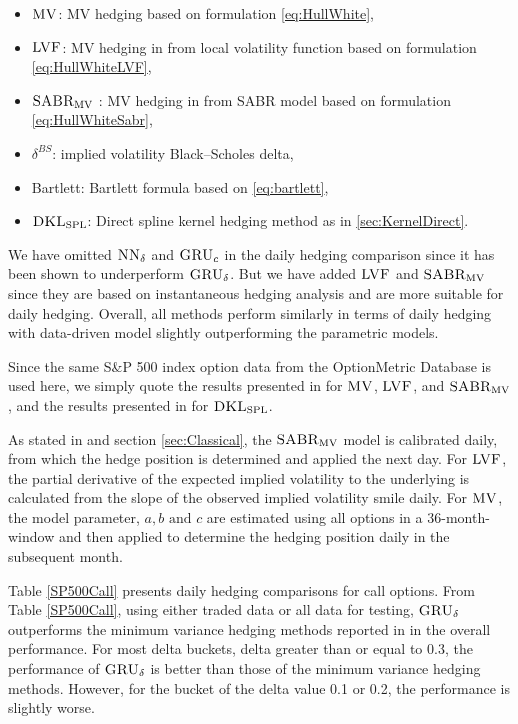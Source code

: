 \documentclass[letterpaper,12pt,titlepage,oneside,final]{book}
\numberwithin{equation}{section}
\theoremstyle{definition}
\newcommand{\model}{\textsc{GRU}_\delta}
\newcommand{\modelN}{\textsc{NN}_\delta}
\newcommand{\DKLs}{\bf\textsc{DKL}_{\text{SPL}}}
\newcommand{\LVF}{\textsc{LVF}}
\newcommand{\SABR}{\bf\textsc{SABR}_{\text{MV}}}
\newcommand{\MV}{\bf \textsc{MV}}
\begin{document}
\begin{itemize}
	\item $\MV$: MV hedging   based on formulation \eqref{eq:HullWhite},
\item ${\LVF}$: MV hedging in \cite{hulloptimal} from local volatility function based on formulation \eqref{eq:HullWhiteLVF},
\item ${\SABR}$ : MV hedging in  \cite{hulloptimal} from {{SABR}} model based on formulation \eqref{eq:HullWhiteSabr},
\item ${\delta^{BS}}$:  implied  volatility Black–Scholes delta,
\item Bartlett: Bartlett formula based on \eqref{eq:bartlett},
  \item $\DKLs$: Direct spline kernel hedging method as in \ref{sec:KernelDirect}.
\end{itemize}

We have omitted  $\modelN$ and $\textsc{GRU}_{c}$ in the daily hedging comparison since it has been shown to underperform $\model$. But we  have added ${\LVF}$ and ${\SABR}$ since they are based on instantaneous hedging analysis and are more suitable for daily hedging. Overall, all methods perform similarly in terms of daily hedging with data-driven model slightly outperforming the parametric models.

Since the  same S\&P 500 index option data from the OptionMetric Database is used here,  we simply quote the results  presented in \cite{hulloptimal} for  $\MV$,  ${\LVF}$,  and ${\SABR}$, and the results  presented in \cite{knian2017} for  $\DKLs$.

As stated in \cite{hulloptimal} and section \ref{sec:Classical},
the ${\SABR}$ model is calibrated daily, from which the hedge position is determined and applied the next day.
For  ${\LVF}$, the partial derivative of the expected implied volatility to the underlying is calculated from the slope of the observed implied volatility smile daily.  For $\MV$, the model parameter, $a,b \text{ and } c$ are estimated using all options in a 36-month-window and then applied to determine the hedging position daily in the subsequent month.


Table \ref{SP500Call} presents daily hedging comparisons for call options.
From  Table \ref{SP500Call}, using either {traded} data or {all} data for testing, $\model$  outperforms the minimum variance hedging methods reported in \cite{hulloptimal} in the overall performance.   For most delta buckets, delta greater than or equal to 0.3, the performance of  $\model$  is better than those of the minimum variance hedging methods. However, for the bucket of the delta value 0.1 or 0.2, the performance is slightly worse.
\end{document}
